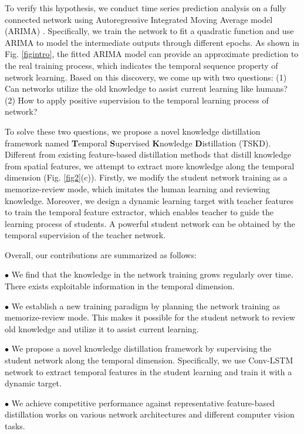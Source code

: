 \documentclass[letterpaper]{article} %
\begin{document}
To verify this hypothesis, we conduct time series prediction analysis on a fully connected network using Autoregressive Integrated Moving Average model (ARIMA) \cite{box1970distribution}. Specifically, we train the network to fit a quadratic function and use ARIMA to model the intermediate outputs through different epochs. As shown in Fig. \ref{figintro}, the fitted ARIMA model can provide an approximate prediction to the real training process, which indicates the temporal sequence property of network learning. Based on this discovery, we come up with two questions: (1) Can networks utilize the old knowledge to assist current learning like humans? (2) How to apply positive supervision to the temporal learning process of network?



To solve these two questions, we propose a novel knowledge distillation framework named \textbf{T}emporal \textbf{S}upervised \textbf{K}nowledge \textbf{D}istillation (TSKD). Different from existing feature-based distillation methods that distill knowledge from spatial features, we attempt to extract more knowledge along the temporal dimension (Fig. \ref{fig2}(c)). Firstly, we modify the student network training as a memorize-review mode, which imitates the human learning and reviewing knowledge. Moreover, we design a dynamic learning target with teacher features to train the temporal feature extractor, which enables teacher to guide the learning process of students. A powerful student network can be obtained by the temporal supervision of the teacher network.



Overall, our contributions are summarized as follows:

$\bullet$ We find that the knowledge in the network training grows regularly over time. There exists exploitable information in the temporal dimension.

$\bullet$ We establish a new training paradigm by planning the network training as memorize-review mode. This makes it possible for the student network to review old knowledge and utilize it to assist current learning.

$\bullet$ We propose a novel knowledge distillation framework by supervising the student network along the temporal dimension. Specifically, we use Conv-LSTM network to extract temporal features in the student learning and train it with a dynamic target.

$\bullet$ We achieve competitive performance against representative feature-based distillation works on various network architectures and different computer vision tasks.
\end{document}
